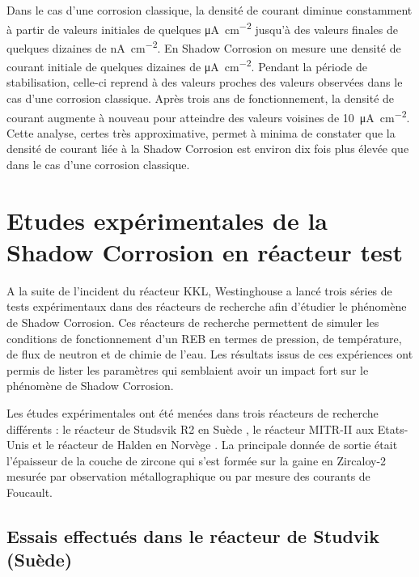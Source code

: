 \begin{refsection}
Dans le cas d'une corrosion classique, la densité de courant diminue constamment à partir de valeurs initiales
 de quelques \si{\micro\ampere\per\square\centi\meter} 
jusqu'à des valeurs finales de quelques dizaines de \si{\nano\ampere\per\square\centi\meter}.
En Shadow Corrosion on mesure une densité de courant initiale de quelques dizaines de 
\si{\micro\ampere\per\square\centi\meter}. Pendant la période de stabilisation, celle-ci reprend à des valeurs proches
des valeurs observées dans le cas d'une corrosion classique.
Après trois ans de fonctionnement, la densité de courant augmente à nouveau pour atteindre des valeurs voisines de
\SI{10}{\micro\ampere\per\square\centi\meter}. Cette analyse, certes très approximative, permet à minima de constater que la
densité de courant liée à la Shadow Corrosion est environ dix fois plus élevée que dans le cas d'une corrosion classique.


\section{Etudes expérimentales de la Shadow Corrosion en réacteur test}\label{sec:in_pile_reactor}

    A la suite de l’incident du réacteur KKL, Westinghouse a lancé trois séries de
    tests expérimentaux dans des réacteurs de recherche afin
    d’étudier le phénomène de Shadow Corrosion. Ces réacteurs de recherche
    permettent de simuler les conditions de fonctionnement d’un REB
    en termes de pression, de température, de flux de neutron et de chimie de
    l’eau. Les résultats issus de ces expériences ont permis de lister les
    paramètres qui semblaient avoir un impact fort sur le phénomène de Shadow Corrosion.

    Les études expérimentales ont été menées dans trois réacteurs de recherche différents :
    le réacteur de Studsvik R2 en Suède \citep{Nystrand1999}, le réacteur MITR-II
    aux Etats-Unis \cite{Chatelain2000} et le réacteur de Halden en Norvège
    \cite{Andersson2002}. La principale donnée de sortie était l’épaisseur de la
    couche de zircone qui s’est formée sur la gaine en Zircaloy-2 mesurée par observation métallographique ou par mesure
    des courants de Foucault.

    \subsection{Essais effectués dans le réacteur de Studvik (Suède)}\label{subsec:studvik}


\end{refsection}
